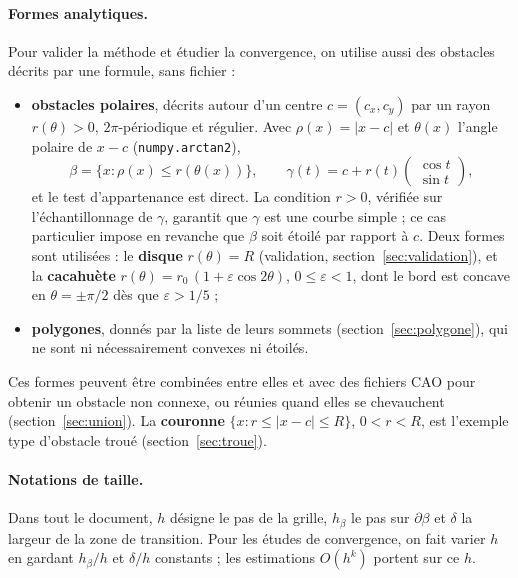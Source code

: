 \documentclass[11pt,a4paper]{article}
\begin{document}
\paragraph{Formes analytiques.} Pour valider la méthode et étudier la
convergence, on utilise aussi des obstacles décrits par une formule, sans
fichier :
\begin{itemize}
  \item \textbf{obstacles polaires}, décrits autour d'un centre
        $c = (c_x, c_y)$ par un rayon $r(\theta) > 0$, $2\pi$-périodique et
        régulier. Avec $\rho(x) = |x - c|$ et $\theta(x)$ l'angle polaire de
        $x - c$ (\texttt{numpy.arctan2}),
        \[
        \beta = \{ x : \rho(x) \le r(\theta(x)) \},
        \qquad
        \gamma(t) = c + r(t) \begin{pmatrix} \cos t \\ \sin t \end{pmatrix},
        \]
        et le test d'appartenance est direct. La condition $r > 0$, vérifiée
        sur l'échantillonnage de $\gamma$, garantit que $\gamma$ est une
        courbe simple ; ce cas particulier impose en revanche que $\beta$ soit
        étoilé par rapport à $c$. Deux formes sont utilisées : le
        \textbf{disque} $r(\theta) = R$ (validation, section~\ref{sec:validation}),
        et la \textbf{cacahuète} $r(\theta) = r_0\,(1 + \varepsilon \cos 2\theta)$,
        $0 \le \varepsilon < 1$, dont le bord est concave en
        $\theta = \pm\pi/2$ dès que $\varepsilon > 1/5$ ;
  \item \textbf{polygones}, donnés par la liste de leurs sommets
        (section~\ref{sec:polygone}), qui ne sont ni nécessairement convexes
        ni étoilés.
\end{itemize}
Ces formes peuvent être combinées entre elles et avec des fichiers CAO pour
obtenir un obstacle non connexe, ou réunies quand elles se chevauchent
(section~\ref{sec:union}). La \textbf{couronne}
$\{x : r \le |x - c| \le R\}$, $0 < r < R$, est l'exemple type d'obstacle
troué (section~\ref{sec:troue}).

\paragraph{Notations de taille.} Dans tout le document, $h$ désigne le pas
de la grille, $h_\beta$ le pas sur $\partial\beta$ et $\delta$ la largeur de
la zone de transition. Pour les études de convergence, on fait varier $h$ en
gardant $h_\beta / h$ et $\delta / h$ constants ; les estimations
$O(h^k)$ portent sur ce $h$.
\end{document}
